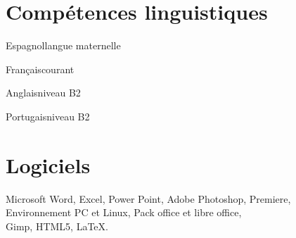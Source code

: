 \documentclass{tccv}
\begin{document}
\section{Compétences linguistiques}

\begin{factlist}
\item{Espagnol}{langue maternelle}	
\item{Français}{courant}	
\item{Anglais}{niveau B2}	
\item{Portugais}{niveau B2}
\end{factlist}

\section{Logiciels}

\begin{factlist}

\item{}{Microsoft Word, Excel, Power Point, Adobe Photoshop, Premiere, \\
Environnement PC et Linux,
Pack office et libre office, \\
Gimp,
HTML5,
\LaTeX.
}


\end{factlist}
\end{document}
